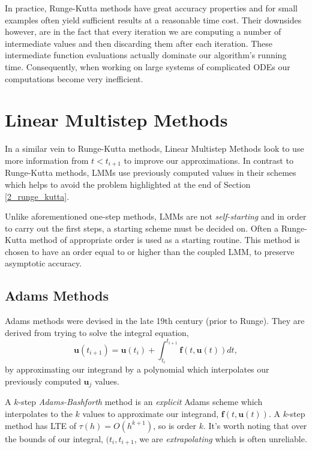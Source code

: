 \documentclass[12pt, twoside]{report}
\theoremstyle{plain}
\theoremstyle{definition}
\theoremstyle{definition}
\begin{document}
            In practice, Runge-Kutta methods have great accuracy properties
            and for small examples often yield sufficient results at a 
            reasonable time cost. Their downsides however, are in the fact
            that every iteration we are computing a number of intermediate
            values and then discarding them after each iteration. These 
            intermediate function evaluations actually dominate our 
            algorithm's running time. Consequently, when working on large 
            systems of complicated ODEs our computations become very 
            inefficient. 

    \section{Linear Multistep Methods}
    \label{2_lmms}
        In a similar vein to Runge-Kutta methods, Linear Multistep Methods 
        look to use more information from $t<t_{i+1}$ to improve our 
        approximations. In contrast to Runge-Kutta methods, LMMs use 
        previously computed values in their schemes which helps to avoid the problem highlighted at the end of Section \ref{2_runge_kutta}.

        Unlike aforementioned one-step methods, LMMs are not 
        \textit{self-starting} and in order to carry out the first steps, a 
        starting scheme must be decided on. Often a Runge-Kutta method of
        appropriate order is used as a starting routine. This method is chosen
        to have an order equal to or higher than the coupled LMM, to preserve
        asymptotic accuracy.

        \subsection{Adams Methods}
        \label{2_adams}
            Adams methods were devised in the late 19th century (prior to 
            Runge). They are derived from trying to solve the integral 
            equation,
            \begin{equation}
            \label{2_int_equation}
                \mathbf{u}(t_{i+1}) = \mathbf{u}(t_i) + \int_{t_i}^{t_{i+1}}
                \mathbf{f}(t, \mathbf{u}(t)) dt,
            \end{equation}
            by approximating our integrand by a polynomial which interpolates
            our previously computed $\mathbf{u}_j$ values.

            A $k$-step \textit{Adams-Bashforth} method is an \textit{explicit}
            Adams scheme which interpolates to the $k$ values to approximate 
            our integrand, $\mathbf{f}(t, \mathbf{u}(t))$. A $k$-step method has LTE of $\tau(h)=O(h^{k+1})$, so is order $k$. It's worth noting that over the bounds of our integral, $(t_i, t_{i+1}$, we are \textit{extrapolating} which is often unreliable.
\end{document}
